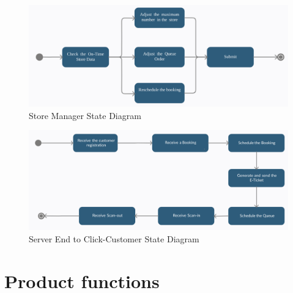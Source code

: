 \documentclass[a4paper,12pt]{report}
\begin{document}
\begin{figure}[H] 
	\centering
	\includegraphics[scale=0.45]{State_diagram2.png}
	\caption{Store Manager State Diagram}
	\centering
	\label{State Diagram 2}
\end{figure}

\begin{figure}[H] 
	\centering
	\includegraphics[scale=0.4]{State_diagram3.png}
	\caption{Server End to Click-Customer State Diagram}
	\centering
	\label{State Diagram 3}
\end{figure}


\newpage

\section{Product functions}
\end{document}
